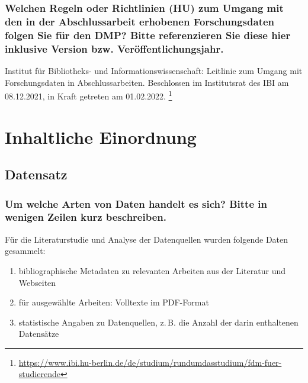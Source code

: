 \documentclass[%
  11pt,
  DIV=16,
  a4paper,
  BCOR=15mm,
  twoside=on,
  bibliography=totoc,
  headings=normal,
  numbers=noendperiod,
]{scrartcl}
\begin{document}
\subsubsection{Welchen Regeln oder Richtlinien (HU) zum Umgang mit den in der Abschlussarbeit erhobenen Forschungsdaten folgen Sie für den DMP? Bitte referenzieren Sie diese hier inklusive Version bzw. Veröffentlichungsjahr.}

Institut für Bibliotheks- und Informationswissenschaft:
Leitlinie zum Umgang mit Forschungsdaten in Abschlussarbeiten.
Beschlossen im Institutsrat des IBI am 08.12.2021, in Kraft getreten am 01.02.2022.%
\footnote{\url{https://www.ibi.hu-berlin.de/de/studium/rundumdasstudium/fdm-fuer-studierende}}

\section{Inhaltliche Einordnung}


\subsection{Datensatz}

\subsubsection{Um welche Arten von Daten handelt es sich? Bitte in wenigen Zeilen kurz beschreiben.}

Für die Literaturstudie und Analyse der Datenquellen wurden folgende Daten gesammelt:
%
\begin{enumerate}[(1)]
  \item
    bibliographische Metadaten zu relevanten Arbeiten aus der Literatur und Webseiten
  \item
    für ausgewählte Arbeiten: Volltexte im PDF-Format
  \item
    statistische Angaben zu Datenquellen, z.\,B. die Anzahl der darin enthaltenen Datensätze
\end{enumerate}

\end{document}
